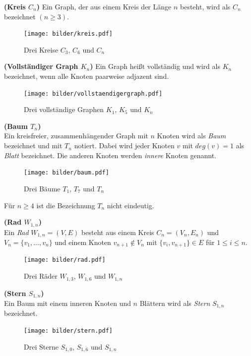 \begin{defi}{\textbf{(Kreis $C_n$)}}\newline
Ein Graph, der aus einem Kreis der Länge $n$ besteht, wird als $C_n$ bezeichnet $(n \geq 3)$. \end{defi}
\begin{figure}[h!]
		\centering 		 
   \texttt{[image: bilder/kreis.pdf]}
	\caption{Drei Kreise $C_3$, $C_6$ und $C_n$}
  	 \end{figure}
\begin{defi}{\textbf{(Vollständiger Graph $K_n$)}}\newline
Ein Graph heißt vollständig und wird als $K_n$ bezeichnet, wenn alle Knoten paarweise adjazent sind.
\end{defi}
\begin{figure}[h!]
		\centering 		 
   \texttt{[image: bilder/vollstaendigergraph.pdf]}
	\caption{Drei vollständige Graphen $K_1$, $K_5$ und $K_n$}
  	 \end{figure}

\begin{defi}{\textbf{(Baum $T_n$)}}\\
Ein kreisfreier, zusammenhängender Graph mit $n$ Knoten wird als \emph{Baum} bezeichnet und mit $T_n$ notiert. Dabei wird jeder Knoten $v$ mit $deg(v)=1$ als \emph{Blatt} bezeichnet. Die anderen Knoten werden \emph{innere} Knoten genannt. \end{defi}
\vspace{-2mm}
\begin{figure}[h!]
		\centering 		 
   \texttt{[image: bilder/baum.pdf]}
	\caption{Drei Bäume $T_{1}$, $T_{7}$ und $T_{n}$}
  	 \end{figure}
\begin{bem}
Für $n \geq 4$ ist die Bezeichnung $T_n$ nicht eindeutig.  
\end{bem}

\begin{defi}{\textbf{(Rad $W_{1,n}$)}}\\
Ein \emph{Rad} $W_{1,n}=(V,E)$ besteht aus einem Kreis $C_n=(V_n,E_n)$ und $V_n=\{v_1, \ldots ,v_n\}$ und einem Knoten $v_{n+1} \notin V_n$ mit $\{v_i, v_{n+1} \} \in E$ für $1 \leq i \leq n$. 
\end{defi}
\vspace{-2mm}
\begin{figure}[h!]
		\centering 		 
   \texttt{[image: bilder/rad.pdf]}
	\caption{Drei Räder $W_{1,3}$, $W_{1,6}$ und $W_{1,n}$}
  	 \end{figure}
\begin{defi}{\textbf{(Stern $S_{1,n}$)}}\\
\label{defstern}
Ein Baum mit einem inneren Knoten und $n$ Blättern wird als \emph{Stern} $S_{1,n}$ bezeichnet. \end{defi}
\vspace{-2mm}
\begin{figure}[h!]
		\centering 		 
   \texttt{[image: bilder/stern.pdf]}
	\caption{Drei Sterne $S_{1,0}$, $S_{1,6}$ und $S_{1,n}$}
  	 \end{figure}

